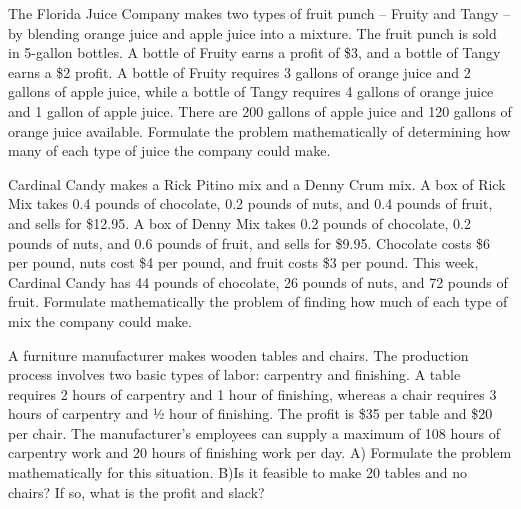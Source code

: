 \documentclass[11pt,epsfig]{article}
\begin{document}
\newpage

\begin{problem}{10}
The Florida Juice Company makes two types of fruit punch – Fruity and Tangy – by blending orange juice and apple juice into a mixture. The fruit punch is sold in 5-gallon bottles. A bottle of Fruity earns a profit of \$3, and a bottle of Tangy earns a \$2 profit. A bottle of Fruity requires 3 gallons of orange juice and 2 gallons of apple juice, while a bottle of Tangy requires 4 gallons of orange juice and 1 gallon of apple juice. There are 200 gallons of apple juice and 120 gallons of orange juice available.
\newline
Formulate the problem mathematically of determining how many of each type of juice the company could make.
\vfill
\end{problem}

\newpage


\begin{problem}{10}
Cardinal Candy makes a Rick Pitino mix and a Denny Crum mix. A box of Rick Mix takes 0.4 pounds of chocolate, 0.2 pounds of nuts, and 0.4 pounds of fruit, and sells for \$12.95. A box of Denny Mix takes 0.2 pounds of chocolate, 0.2 pounds of nuts, and 0.6 pounds of fruit, and sells for \$9.95. Chocolate costs \$6 per pound, nuts cost \$4 per pound, and fruit costs \$3 per pound. This week, Cardinal Candy has 44 pounds of chocolate, 26 pounds of nuts, and 72 pounds of fruit.
\newline
Formulate mathematically the problem of finding how much of each type of mix the company could make.

\vfill
\end{problem}


\newpage



\newpage

\begin{problem}{15}
A furniture manufacturer makes wooden tables and chairs. The production process involves two basic types of labor: carpentry and finishing. A table requires 2 hours of carpentry and 1 hour of finishing, whereas a chair requires 3 hours of carpentry and ½ hour of finishing. The profit is \$35 per table and \$20 per chair. The manufacturer's employees can supply a maximum of 108 hours of carpentry work and 20 hours of finishing work per day.
\newline
A) Formulate the problem mathematically for this situation.
\newline
B)Is it feasible to make 20 tables and no chairs? If so, what is the profit and slack?
\vfill
\end{problem}
\end{document}

